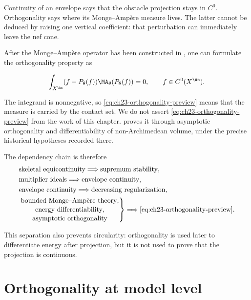 Continuity of an envelope says that the obstacle projection stays in
\(C^0\).  Orthogonality says where its Monge--Amp\`ere measure lives.  The
latter cannot be deduced by raising one vertical coefficient: that
perturbation can immediately leave the nef cone.

After the Monge--Amp\`ere operator has been constructed in
, one can formulate the orthogonality property as

\begin{equation}\label{eq:ch23-orthogonality-preview}
 \int_{X^{\An}}
       (f-P_\theta(f))
       \MA_\theta(P_\theta(f))=0,
 \qquad f\in C^0(X^{\An}).
\end{equation}

The integrand is nonnegative, so \eqref{eq:ch23-orthogonality-preview}
means that the measure is carried by the contact set.  We do not assert
\eqref{eq:ch23-orthogonality-preview} from the work of this chapter.
 proves it through asymptotic
orthogonality and differentiability of non-Archimedean volume, under the
precise historical hypotheses recorded there.

The dependency chain is therefore
\begin{equation}\label{eq:ch23-dependency-chain}
 \begin{aligned}
  &\text{skeletal equicontinuity}
    \Longrightarrow \text{supremum stability},\\
  &\text{multiplier ideals}
    \Longrightarrow \text{envelope continuity},\\
  &\text{envelope continuity}
    \Longrightarrow \text{decreasing regularization},\\
  &\left.
    \begin{gathered}
      \text{bounded Monge--Amp\`ere theory},\\[-2pt]
      \text{energy differentiability},\\[-2pt]
      \text{asymptotic orthogonality}
    \end{gathered}
    \right\}
    \Longrightarrow \eqref{eq:ch23-orthogonality-preview}.
 \end{aligned}
\end{equation}

This separation also prevents circularity: orthogonality is used later to
differentiate energy after projection, but it is not used to prove that the
projection is continuous.

\section{Orthogonality at model level}
\label{sec:ch23-model-orthogonality}

